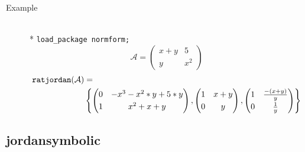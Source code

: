 \begin{description}
\item[Example]\mbox{}\\*
\texttt{load\_package normform;}
\[
\mathcal{A} = \begin{pmatrix} x+y & 5 \\ y & x^2 \end{pmatrix}
\]
\[
\begin{split}
\texttt{ratjordan}(\mathcal{A}) &= \\
& \left\{
    \begin{pmatrix} 0 & -x^3-x^2*y+5*y \\[1mm] 1 & x^2+x+y \end{pmatrix},
    \begin{pmatrix} 1 & x+y \\[1mm] 0 & y \end{pmatrix},
    \begin{pmatrix} 1 & \frac{-(x+y)}{y} \\[1mm] 0 &  \frac{1}{y} \end{pmatrix}
  \right\}
\end{split}
\]
\end{description}

\subsection{jordansymbolic}

